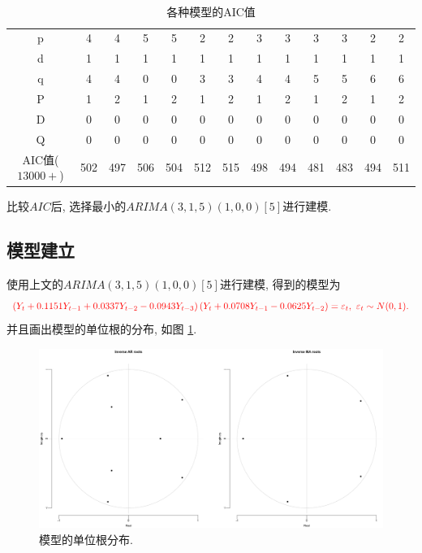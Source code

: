 \documentclass[11pt]{article}
\begin{document}
\ 
\vspace{-20pt}\begin{table}[htbp]
    \centering
    \caption{各种模型的AIC值}
    \label{tab:my-table2}
    \begin{tabular}{c|cccccccccccc}
    \hline
    p & 4 & 4 & 5 & 5 & 2 & 2 & 3 & 3 & 3 & 3 & 2 & 2 \\
    d & 1 & 1 & 1 & 1 & 1 & 1 & 1 & 1 & 1 & 1 & 1 & 1 \\
    q & 4 & 4 & 0 & 0 & 3 & 3 & 4 & 4 & 5 & 5 & 6 & 6 \\
    P & 1 & 2 & 1 & 2 & 1 & 2 & 1 & 2 & 1 & 2 & 1 & 2 \\
    D & 0 & 0 & 0 & 0 & 0 & 0 & 0 & 0 & 0 & 0 & 0 & 0 \\
    Q & 0 & 0 & 0 & 0 & 0 & 0 & 0 & 0 & 0 & 0 & 0 & 0 \\ \hline
    AIC值($13000+$) & 502 & 497 & 506 & 504 & 512 & 515 & 498 & 494 & 481 & 483 & 494 & 511 \\ \hline
    \end{tabular}
\end{table}

比较$AIC$后, 选择最小的$ARIMA(3,1,5)(1,0,0)[5]$进行建模. 
\subsection{模型建立}
\qquad 使用上文的$ARIMA(3,1,5)(1,0,0)[5]$进行建模, 得到的模型为
\[
    \textcolor{red}{\left(Y_t+0.1151 Y_{t-1}+ 0.0337Y_{t-2}-0.0943 Y_{t-3}\right)\left(Y_t+0.0708Y_{t-1}-0.0625Y_{t-2}\right)=\varepsilon_t,\ \varepsilon_t\sim N(0,1).}
\]
并且画出模型的单位根的分布, 如图 \ref{fig:m1r}.
\begin{figure}[htbp]
    \centering
    \includegraphics[width=.85\textwidth]{m1}
    \caption{模型的单位根分布. \label{fig:m1r}}
\end{figure}
\end{document}
